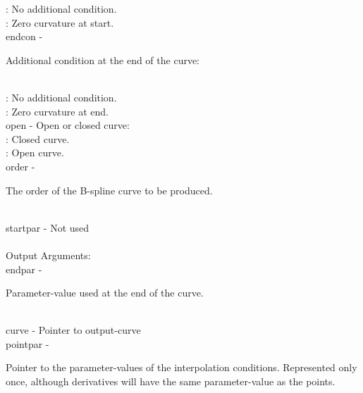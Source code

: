                 \>\>\>\> :     No additional condition.\\
                \>\>\>\> :     Zero curvature at start.\\
        \>\>    {\fov endcon}   \> - \> \begin{minipg2}
                                Additional condition at the end
                                of the curve:
                                \end{minipg2}\\
                \>\>\>\> :     No additional condition.\\
                \>\>\>\> :     Zero curvature at end.\\
        \>\>    {\fov open}     \> - \> Open or closed curve:\\
                \>\>\>\> :     Closed curve.\\
                \>\>\>\> :     Open curve.\\
        \>\>    {\fov order}    \> - \> \begin{minipg2}
                                The order of the B-spline curve
                                to be produced.
                                \end{minipg2}\\
        \>\>    {\fov startpar} \> - \>
                                Not used\\
\\
        \>Output Arguments:\\
        \>\>    {\fov endpar}   \> - \> \begin{minipg2}
                                Parameter-value used at the end
                                of the curve.
                                \end{minipg2}\\
        \>\>    {\fov curve}    \> - \> Pointer to output-curve\\
        \>\>    {\fov pointpar} \> - \> \begin{minipg2}
                                Pointer to the parameter-values of
                                the interpolation conditions. Represented only once, although
                                derivatives
                                will have the same
                                parameter-value as the points.
                                \end{minipg2} \\[0.3ex]
